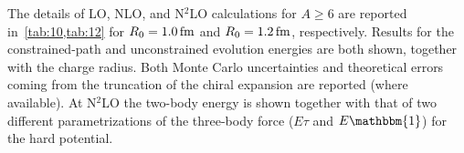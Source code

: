 \documentclass[aps,prc,twocolumn,superscriptaddress,showpacs,floatfix,nofootinbib]{revtex4-1}
\begin{document}
The details of LO, NLO, and N$^2$LO calculations for $A\ge6$ are reported in~\cref{tab:10,tab:12}
for $R_0=1.0\,\rm fm$ and $R_0=1.2\,\rm fm$, respectively. Results for the constrained-path and 
unconstrained evolution energies are both shown, together with the charge radius.
Both Monte Carlo uncertainties and theoretical errors coming from the truncation of the chiral 
expansion are reported (where available). At N$^2$LO the two-body energy is shown together with
that of two different parametrizations of the three-body force ($E\tau$ and $E\mathbbm{1}$)
for the hard potential. 
\end{document}
